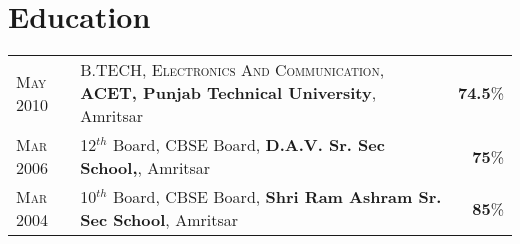 \documentclass[a4paper]{article} %
\newcommand{\verticalspacing}{-0.25cm}
\newcommand{\bulletspace}{0.7cm}
\newcommand{\projectheadspacing}{6.9cm}
\newcommand{\cproject}[5]{%
    \begin{tabular}{p{0.60\linewidth}r}
        \textcolor{blue}{\small #2} & \multicolumn{1}{m{ \projectheadspacing{} }}{\raggedleft \small {\textsc{#1}}}\\
        \small {#3} & \small {#4}
    \end{tabular}\\
    \begin{tabular}{p{0.98\linewidth}}
    \vspace{-0.3cm}
        \small{#5}
    \end{tabular}
    \vspace{\verticalspacing{}}
}
\begin{document}
%




\section{Education}
\def\arraystretch{1.2}
\begin{tabular}{>{\raggedleft}p{1.5cm}p{14.6cm}r}

    \textsc{May 2010} & B.TECH, \textsc{Electronics And Communication},
    \textbf{ACET, Punjab Technical University}, Amritsar
    & \textbf{74.5}\%\\

    \textsc{Mar 2006} & 12$^{th}$ Board, \textsc{CBSE} Board,
    \textbf{D.A.V. Sr. Sec School,}, Amritsar
    & \textbf{75}\% \\

    \textsc{Mar 2004} & 10$^{th}$ Board, \textsc{CBSE} Board,
    \textbf{Shri Ram Ashram Sr. Sec School}, Amritsar
    & \textbf{85}\% \\

\end{tabular}
\def\arraystretch{1}
\end{document}
